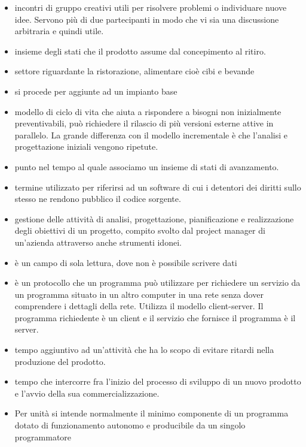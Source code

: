 
\begin{itemize} 

	\item {} incontri di gruppo creativi utili per risolvere problemi o individuare nuove idee. Servono più di due partecipanti in modo che vi sia una discussione arbitraria e quindi utile.
	\item {} insieme degli stati che il prodotto assume dal concepimento al ritiro.
	\item {} settore riguardante la ristorazione, alimentare cioè cibi e bevande
	\item  {} si procede per aggiunte ad un impianto base
	\item {} modello di ciclo di vita che aiuta a rispondere a bisogni non inizialmente preventivabili, può richiedere il rilascio di più versioni esterne attive in parallelo. La grande differenza con il modello incrementale è che l'analisi e progettazione iniziali vengono ripetute.
	\item {} punto nel tempo al quale associamo un insieme di stati di avanzamento.
	\item {} termine utilizzato per riferirsi ad un software di cui i detentori dei diritti sullo stesso ne rendono pubblico il codice sorgente.
	\item {} gestione delle attività di analisi, progettazione, pianificazione e realizzazione degli obiettivi di un progetto, compito svolto dal project manager di un'azienda attraverso anche strumenti idonei.
	\item {} è un campo di sola lettura, dove non è possibile scrivere dati
	\item {} è un  protocollo  che un programma può utilizzare per richiedere un servizio da un programma situato in un altro computer in una rete senza dover comprendere i dettagli della rete. Utilizza il   modello client-server. Il programma richiedente è un client e il servizio che fornisce il programma è il server.
	\item {} tempo aggiuntivo ad un'attività che ha lo scopo di evitare ritardi nella produzione del prodotto.
	\item {} tempo che intercorre fra l’inizio del processo di sviluppo di un nuovo prodotto e l’avvio della sua commercializzazione.
	\item {} Per unità si intende normalmente il minimo componente di un programma dotato di funzionamento autonomo e producibile da un singolo programmatore

\end{itemize} 
